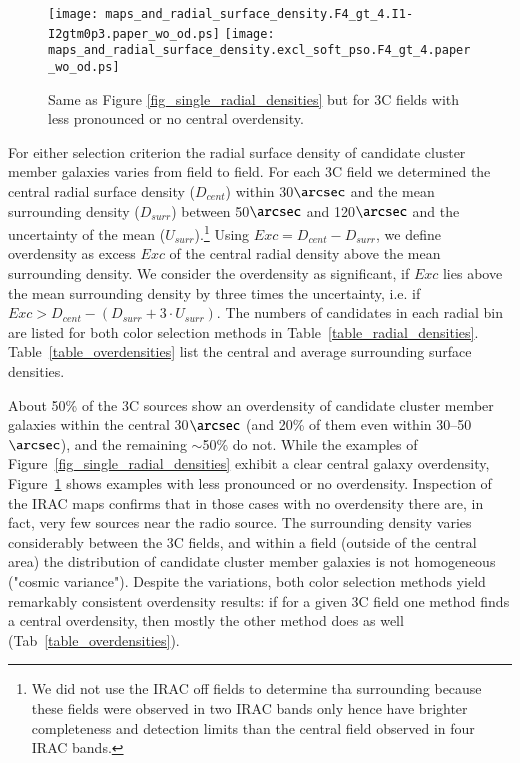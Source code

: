 \documentclass[mathleft,fleqn,%
]{an}
\begin{document}
 
\begin{figure}
  \texttt{[image: maps\_and\_radial\_surface\_density.F4\_gt\_4.I1-I2gtm0p3.paper\_wo\_od.ps]}
  \texttt{[image: maps\_and\_radial\_surface\_density.excl\_soft\_pso.F4\_gt\_4.paper\_wo\_od.ps]}
  \caption{Same as Figure \ref{fig_single_radial_densities} but for 3C fields
    with less pronounced or no central overdensity.
  }
  \label{fig_single_radial_densities_without_overdensity}
\end{figure}

For either selection criterion the radial surface density  of 
candidate cluster member galaxies varies from field to field.  
For each 3C field we determined the central 
radial surface density ($D_{cent}$) within 30$\arcsec$  
and the mean surrounding density ($D_{surr}$)
between 50$\arcsec$ and 120$\arcsec$ and the uncertainty of the 
mean ($U_{surr}$).\footnote{We did not use the
  IRAC off fields to determine tha surrounding because these fields
  were observed in two IRAC bands only hence have 
  brighter completeness and detection limits than the central field
  observed in four IRAC bands.}
Using $Exc = D_{cent} - D_{surr}$,
we define overdensity as %
excess $Exc$ of the central 
radial density above the mean surrounding density.
We consider the overdensity as significant, 
if $Exc$ lies 
above the mean surrounding density by three times the uncertainty, i.e. if 
$Exc > D_{cent}  - (D_{surr} + 3 \cdot U_{surr})$.
The numbers of candidates in each radial bin 
are listed for both color selection methods 
in Table~\ref{table_radial_densities}.
Table~\ref{table_overdensities} list the central and average 
surrounding surface densities.

About 50\% of the 3C sources show an overdensity of candidate cluster member
galaxies within the  
central 30$\arcsec$ (and 20\% of them even within 30--50$\arcsec$), 
and the remaining $\sim$50\% do not. 
While the examples of 
Figure~\ref{fig_single_radial_densities} exhibit a clear central galaxy
overdensity, Figure~\ref{fig_single_radial_densities_without_overdensity}
shows examples with less pronounced or no
overdensity.
Inspection of the IRAC maps confirms that in those cases with no
overdensity there are, in fact, very few sources near the radio
source. 
The surrounding density varies considerably between the 3C fields, 
and within a field (outside of the central area) the distribution
of candidate cluster member galaxies is not homogeneous 
("cosmic variance"). 
Despite the  variations, both color selection methods yield
remarkably consistent overdensity results:  
if for a given 3C field one method finds a central overdensity, 
then mostly the other method does as well (Tab~\ref{table_overdensities}). 
\end{document}
